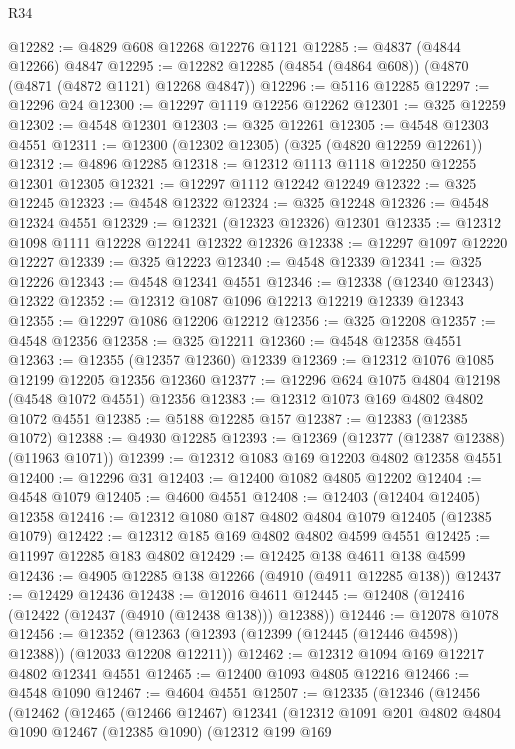 \begin{lexlean}{R34}
\begin{coremodule}
@12282 := @4829 @608 @12268 @12276 @1121
@12285 := @4837 (@4844 @12266) @4847
@12295 := @12282 @12285 (@4854 (@4864 @608)) (@4870 (@4871 (@4872 @1121) @12268 @4847))
@12296 := @5116 @12285
@12297 := @12296 @24
@12300 := @12297 @1119 @12256 @12262
@12301 := @325 @12259
@12302 := @4548 @12301
@12303 := @325 @12261
@12305 := @4548 @12303 @4551
@12311 := @12300 (@12302 @12305) (@325 (@4820 @12259 @12261))
@12312 := @4896 @12285
@12318 := @12312 @1113 @1118 @12250 @12255 @12301 @12305
@12321 := @12297 @1112 @12242 @12249
@12322 := @325 @12245
@12323 := @4548 @12322
@12324 := @325 @12248
@12326 := @4548 @12324 @4551
@12329 := @12321 (@12323 @12326) @12301
@12335 := @12312 @1098 @1111 @12228 @12241 @12322 @12326
@12338 := @12297 @1097 @12220 @12227
@12339 := @325 @12223
@12340 := @4548 @12339
@12341 := @325 @12226
@12343 := @4548 @12341 @4551
@12346 := @12338 (@12340 @12343) @12322
@12352 := @12312 @1087 @1096 @12213 @12219 @12339 @12343
@12355 := @12297 @1086 @12206 @12212
@12356 := @325 @12208
@12357 := @4548 @12356
@12358 := @325 @12211
@12360 := @4548 @12358 @4551
@12363 := @12355 (@12357 @12360) @12339
@12369 := @12312 @1076 @1085 @12199 @12205 @12356 @12360
@12377 := @12296 @624 @1075 @4804 @12198 (@4548 @1072 @4551) @12356
@12383 := @12312 @1073 @169 @4802 @4802 @1072 @4551
@12385 := @5188 @12285 @157
@12387 := @12383 (@12385 @1072)
@12388 := @4930 @12285
@12393 := @12369 (@12377 (@12387 @12388) (@11963 @1071))
@12399 := @12312 @1083 @169 @12203 @4802 @12358 @4551
@12400 := @12296 @31
@12403 := @12400 @1082 @4805 @12202
@12404 := @4548 @1079
@12405 := @4600 @4551
@12408 := @12403 (@12404 @12405) @12358
@12416 := @12312 @1080 @187 @4802 @4804 @1079 @12405 (@12385 @1079)
@12422 := @12312 @185 @169 @4802 @4802 @4599 @4551
@12425 := @11997 @12285 @183 @4802
@12429 := @12425 @138 @4611 @138 @4599
@12436 := @4905 @12285 @138 @12266 (@4910 (@4911 @12285 @138))
@12437 := @12429 @12436
@12438 := @12016 @4611
@12445 := @12408 (@12416 (@12422 (@12437 (@4910 (@12438 @138))) @12388))
@12446 := @12078 @1078
@12456 := @12352 (@12363 (@12393 (@12399 (@12445 (@12446 @4598)) @12388)) (@12033 @12208 @12211))
@12462 := @12312 @1094 @169 @12217 @4802 @12341 @4551
@12465 := @12400 @1093 @4805 @12216
@12466 := @4548 @1090
@12467 := @4604 @4551
@12507 := @12335
    (@12346
      (@12456
        (@12462
          (@12465
            (@12466 @12467)
            @12341
            (@12312
              @1091
              @201
              @4802
              @4804
              @1090
              @12467
              (@12385 @1090)
              (@12312
                @199
                @169

\end{coremodule}
\end{lexlean}
